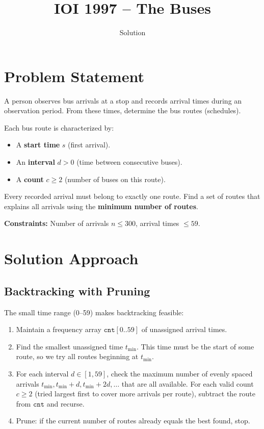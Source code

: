 \documentclass[11pt,a4paper]{article}
\title{IOI 1997 -- The Buses}
\author{Solution}
\date{}
\begin{document}
\maketitle

\section{Problem Statement}

A person observes bus arrivals at a stop and records arrival times during an observation
period. From these times, determine the bus routes (schedules).

Each bus route is characterized by:
\begin{itemize}
  \item A \textbf{start time} $s$ (first arrival).
  \item An \textbf{interval} $d > 0$ (time between consecutive buses).
  \item A \textbf{count} $c \ge 2$ (number of buses on this route).
\end{itemize}

Every recorded arrival must belong to exactly one route. Find a set of routes that
explains all arrivals using the \textbf{minimum number of routes}.

\medskip
\noindent\textbf{Constraints:} Number of arrivals $n \le 300$, arrival times $\le 59$.

\section{Solution Approach}

\subsection{Backtracking with Pruning}

The small time range (0--59) makes backtracking feasible:

\begin{enumerate}
  \item Maintain a frequency array $\mathtt{cnt}[0..59]$ of unassigned arrival times.
  \item Find the smallest unassigned time $t_{\min}$. This time must be the start of
        some route, so we try all routes beginning at $t_{\min}$.
  \item For each interval $d \in [1, 59]$, check the maximum number of evenly spaced
        arrivals $t_{\min}, t_{\min}+d, t_{\min}+2d, \ldots$ that are all available.
        For each valid count $c \ge 2$ (tried largest first to cover more arrivals per route),
        subtract the route from $\mathtt{cnt}$ and recurse.
  \item Prune: if the current number of routes already equals the best found, stop.
\end{enumerate}
\end{document}
